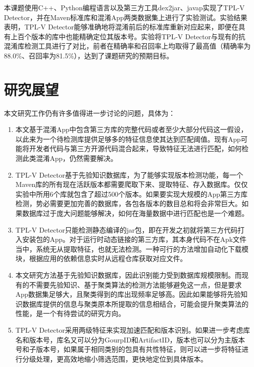 本课题使用C++、Python编程语言以及第三方工具dex2jar、javap实现了TPL-V Detector，并在Maven标准库和混淆App两类数据集上进行了实验测试。实验结果表明，TPL-V Detector能够准确地将混淆前后的标准库重新对应起来，即便在具有上百个版本的库中也能精确定位其版本号。实验将TPL-V Detector与现有的抗混淆库检测工具进行了对比，前者在精确率和召回率上均取得了最高值（精确率为88.0\%、召回率为81.5\%），达到了课题研究的预期目标。


\section{研究展望}

本文研究工作仍有许多值得进一步讨论的问题，具体为：
\begin{enumerate}
\item{本文基于混淆App中包含第三方库的完整代码或者至少大部分代码这一假设，以此来为一个待检测库提供足够多的特征信息使其达到匹配阈值。现有App可能将开发者代码与第三方开源代码混合起来，导致特征无法进行匹配，如何检测此类混淆App，仍然需要解决。}
\item{TPL-V Detector基于先验知识数据库，为了能够实现版本检测功能，每一个Maven库的所有现在活跃版本都需要爬取下来、提取特征、存入数据库。仅仅实验中所用6个库就包含了超过500个版本。如果要实现大规模的App第三方库检测，势必需要更加完善的数据库，各包各版本的数目总和将会非常巨大。如果数据库过于庞大问题能够解决，如何在海量数据中进行匹配也是一个难题。}
\item{TPL-V Detector只能检测静态编译的jar包，即在开发之初就将第三方代码打入安装包的App。对于运行时动态链接的第三方库，其本身代码不在Apk文件当中，系统无从提取特征，也就无法检测。一种可行的方法增加自动化下载模块，根据应用的依赖信息实时从远程仓库获取对应文件。}
\item{本文研究方法基于先验知识数据库，因此识别能力受到数据库规模限制。而现有的不需要先验知识、基于聚类算法的检测方法能够避免这一点，但是要求App数据集足够大，且聚类得到的库出现频率足够高。因此如果能够将先验知识数据库提供的信息与聚类原本所提取的信息相结合，可能会提升聚类算法的性能，是一个有待尝试的研究方向。}
\item{TPL-V Detector采用两级特征来实现加速匹配和版本识别。如果进一步考虑库名和版本号，库名又可以分为GourpID和ArtifactID，版本也可以分为主版本号和子版本号，如果属于相同类别的包具有共性特征，则可以进一步将特征进行分级处理，更高效地缩小筛选范围，更快地定位到具体版本。}
\end{enumerate}






